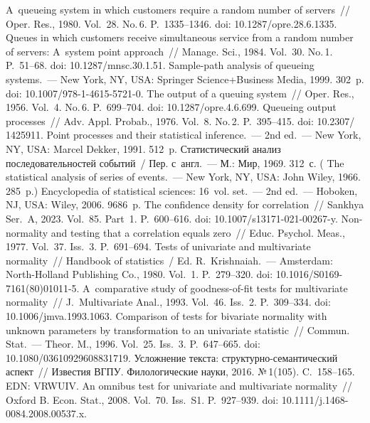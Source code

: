 \begin{multicols}{2}
{\small\frenchspacing
 { %
 \begin{thebibliography}{99}
 A~queueing system in which customers require a random number of servers~// Oper. 
Res., 1980. Vol.~28. No.\,6. P.~1335--1346. doi: 10.1287/opre.28.6.1335.
 Queues in which customers receive simultaneous service from a random 
number of servers: A~system point approach~// Manage. Sci., 1984. Vol.~30. No.\,1.  
P.~51--68. doi: 10.1287/mnsc.30.1.51.
 Sample-path analysis of queueing systems.~--- New York, NY, 
USA: Springer Science\;+\;Business Media, 1999. 302~p. doi: 10.1007/978-1-4615-5721-0.
 The output of a queuing system~// Oper. Res., 1956. Vol.~4. No.\,6. P.~699--704. 
doi: 10.1287/opre.4.6.699.
 Queueing output processes~// Adv. \mbox{Appl.} Probab., 1976. Vol.~8. No.\,2. 
 P.~395--415. doi: 10.2307/ 1425911.
 Point processes and their statistical inference.~--- 2nd ed.~--- New York, NY, USA: 
Marcel Dekker, 1991. 512~p.
 Статистический анализ последовательностей событий~/
Пер. с~англ.~--- М.: Мир, 
1969. 312~с. ( {The statistical analysis of series 
of events}.~--- New York, NY, USA: John Wiley, 1966. 285~p.)
 Encyclopedia of statistical sciences: 
16~vol. set.~--- 2nd ed.~--- Hoboken, NJ, USA: Wiley, 2006. 9686~p.
 The confidence density for correlation~// Sankhya Ser.~A, 2023. 
Vol.~85. Part~1. P.~600--616. doi: 10.1007/s13171-021-00267-y.
 Non-normality and testing that a correlation equals zero~// Educ. Psychol. 
Meas., 1977. Vol.~37. Iss.~3. P.~691--694.
 Tests of univariate and multivariate normality~// Handbook of statistics~/ Ed. 
R.~Krishnaiah.~--- Amsterdam: North-Holland Publishing Co., 1980. Vol.~1. P.~279--320.
doi: 10.1016/S0169-7161(80)01011-5.
 A~comparative study of goodness-of-fit tests for multivariate 
normality~// J.~Multivariate Anal., 1993. Vol.~46. Iss.~2. P.~309--334. doi: 
10.1006/\linebreak jmva.1993.1063.
 Comparison of tests for bivariate normality with unknown parameters by 
transformation to an univariate statistic~// Commun. Stat.~--- Theor. M., 1996. Vol.~25. Iss.~3. 
P.~647--665.  doi: 10.1080/03610929608831719.
 Усложнение текста: струк\-тур\-но-се\-ман\-ти\-че\-ский аспект~// Известия 
ВГПУ. Филологические науки, 2016. №\,1(105). C.~158--165. EDN: VRWUIV.
 An omnibus test for univariate and multivariate normality~// Oxford B. 
Econ. Stat., 2008. Vol.~70. Iss.~S1. P.~927--939. doi: 10.1111/j.1468-0084.2008.00537.x.
\end{thebibliography}

 }
 }

\end{multicols}

